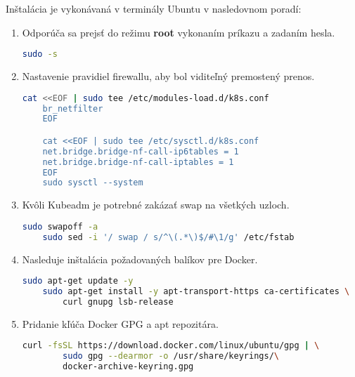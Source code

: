Inštalácia je vykonávaná v terminály Ubuntu v nasledovnom poradí:
\begin{enumerate}
    \item{\noindent Odporúča sa prejsť do režimu \textbf{root} vykonaním príkazu a zadaním hesla.
\begin{lstlisting}[language=Bash,basicstyle=\footnotesize]
    sudo -s
    \end{lstlisting}}
\item{\noindent Nastavenie pravidiel firewallu, aby bol viditeľný premostený prenos.
\begin{lstlisting}[language=Bash,basicstyle=\footnotesize]
    cat <<EOF | sudo tee /etc/modules-load.d/k8s.conf
    br_netfilter
    EOF

    cat <<EOF | sudo tee /etc/sysctl.d/k8s.conf
    net.bridge.bridge-nf-call-ip6tables = 1
    net.bridge.bridge-nf-call-iptables = 1
    EOF
    sudo sysctl --system
    \end{lstlisting}}
    \item{\noindent Kvôli Kubeadm je potrebné zakázať swap na všetkých uzloch.
\begin{lstlisting}[language=Bash,basicstyle=\footnotesize]
    sudo swapoff -a
    sudo sed -i '/ swap / s/^\(.*\)$/#\1/g' /etc/fstab
    \end{lstlisting}}
    \item{\noindent Nasleduje inštalácia požadovaných balíkov pre Docker.
\begin{lstlisting}[language=Bash,basicstyle=\footnotesize]
    sudo apt-get update -y
    sudo apt-get install -y apt-transport-https ca-certificates \
        curl gnupg lsb-release
    \end{lstlisting}}
    \item{\noindent Pridanie kľúča Docker GPG a apt repozitára.
\begin{lstlisting}[language=Bash,basicstyle=\footnotesize]
    curl -fsSL https://download.docker.com/linux/ubuntu/gpg | \
        sudo gpg --dearmor -o /usr/share/keyrings/\
        docker-archive-keyring.gpg


\end{lstlisting}}
\end{enumerate}
